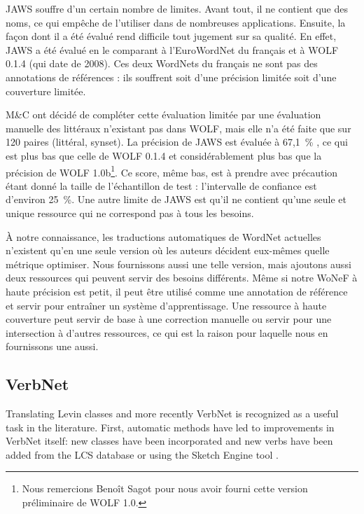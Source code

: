 JAWS souffre d'un certain nombre de limites. Avant tout, il ne contient que des
noms, ce qui empêche de l'utiliser dans de nombreuses applications. Ensuite, la
façon dont il a été évalué rend difficile tout jugement sur sa qualité. En
effet, JAWS a été évalué en le comparant à l'EuroWordNet du français et à WOLF
0.1.4 (qui date de 2008). Ces deux WordNets du français ne sont pas des
annotations de références : ils souffrent soit d'une précision limitée soit
d'une couverture limitée.

M\&C ont décidé de compléter cette évaluation limitée par une évaluation
manuelle des littéraux n'existant pas dans WOLF, mais elle n'a été faite que
sur 120 paires (littéral, synset). La précision de JAWS est évaluée à 67,1~\%
\citep{mouton2010phd}, ce qui est plus bas que celle de WOLF 0.1.4 et
considérablement plus bas que la précision de WOLF 1.0b\footnote{Nous
remercions Benoît Sagot pour nous avoir fourni cette version préliminaire de
WOLF 1.0.}. Ce score, même bas, est à prendre avec précaution étant donné la
taille de l'échantillon de test : l'intervalle de confiance est d'environ
25~\%. Une autre limite de JAWS est qu'il ne contient qu'une seule et unique
ressource qui ne correspond pas à tous les besoins.

À notre connaissance, les traductions automatiques de WordNet actuelles
n'existent qu'en une seule version où les auteurs décident eux-mêmes quelle
métrique optimiser. Nous fournissons aussi une telle version, mais ajoutons
aussi deux ressources qui peuvent servir des besoins différents. Même si notre
WoNeF à haute précision est petit, il peut être utilisé comme une annotation de
référence et servir pour entraîner un système d'apprentissage. Une ressource à
haute couverture peut servir de base à une correction manuelle ou servir pour
une intersection à d'autres ressources, ce qui est la raison pour laquelle nous
en fournissons une aussi.


\subsection{VerbNet}

Translating Levin classes and more recently VerbNet is recognized as a useful
task in the literature. First, automatic methods have led to improvements in
VerbNet itself: new classes have been incorporated
\citep{korhonen2004extended} and new verbs have been added from the LCS
database \citep{dorr2001lcs} or using the Sketch Engine tool
\citep{bonial2013expanding}.

